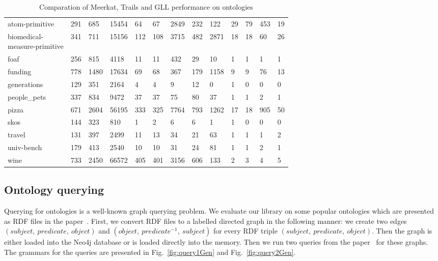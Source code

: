 \begin{table*}[t]
\begin{tabular}{|l|ll|lllll|lllll|}
\hline\hline
atom-primitive              & 291 & 685  & 15454 & 64  & 67 & 2849 & 232 & 122  &  29 &  79 & 453 & 19 \\
\shortstack[l]{biomedical- \\
 measure-primitive}         & 341 & 711  & 15156 & 112 & 108 & 3715 & 482 & 2871 &  18 & 18 & 60  & 26 \\
foaf                        & 256 & 815  & 4118  & 11  & 11  & 432  & 29  & 10   &  1  & 1  & 1   & 1 \\
funding                     & 778 & 1480 & 17634 & 69  & 68  & 367  & 179 & 1158 &  9  & 9   & 76  & 13 \\
generations                 & 129 & 351  & 2164  & 4   & 4   & 9    & 12  & 0    &  1  & 0  & 0   & 0 \\
people\_pets                & 337 & 834  & 9472  & 37  & 37  & 75   & 80  & 37   &  1  & 1  & 2   & 1 \\
pizza                       & 671 & 2604 & 56195 & 333 & 325 & 7764 & 793 & 1262 &  17 & 18 & 905 & 50 \\
skos                        & 144 & 323  & 810   & 1   & 2   & 6    & 6   & 1    &  1  & 0  & 0   & 0 \\
travel                      & 131 & 397  & 2499  & 11  & 13  & 34   & 21  & 63   &  1  & 1  & 1   & 2 \\
univ-bench                  & 179 & 413  & 2540  & 10  & 10  & 31   & 24  & 81   &  1  & 1  & 2   & 1 \\
wine                        & 733 & 2450 & 66572 & 405 & 401 & 3156 & 606 & 133  &  2  & 3  & 4   & 5 \\
\hline
\end{tabular}
\caption{Comparation of Meerkat, Trails and GLL performance on ontologies}
\label{table:rdfs}
\end{table*}


\subsection{Ontology querying}
\label{sec:ontology}

Querying for ontologies is a well-known graph querying problem. We evaluate our library on some popular ontologies which are presented as RDF files in the paper~\cite{CFGonRDF}. 
First, we convert RDF files to a labelled directed graph in the following manner: we create two edges $(subject,\ predicate,\ object)$ and $(object,\ predicate^{-1},\ subject)$ for every RDF triple $(subject,\ predicate,\ object)$. Then the graph is either loaded into the Neo4j database or is loaded directly into the memory. 
Then we run two queries from the paper~\cite{GrigorevR16} for these graphs. The grammars for the queries are presented in Fig.~\ref{fig:query1Gen} and Fig.~\ref{fig:query2Gen}.

